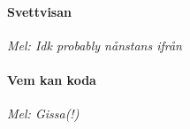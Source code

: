 \documentclass[12pt]{article}
\begin{document}
\noindent
\begin{minipage}{0.55\textwidth}
	\paragraph*{Svettvisan\\}
	\vspace{3px}
	\textit{Mel: Idk probably nånstans ifrån}\\
\end{minipage}%
\hspace{0.05\textwidth}
\noindent
\begin{minipage}{0.4\textwidth}
	\paragraph*{Vem kan koda\\}
	\vspace{3px}
	\textit{Mel: Gissa(!)}\\
\end{minipage}
\end{document}
